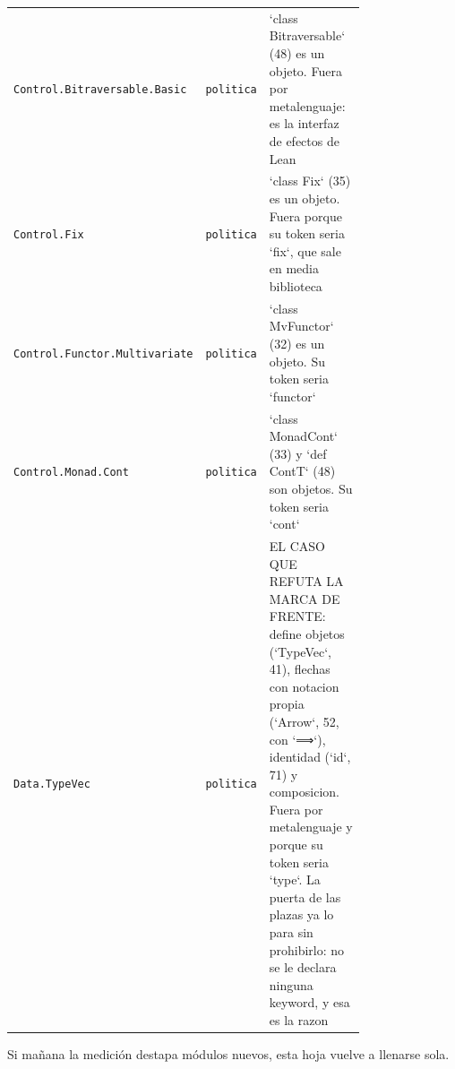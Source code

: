 \documentclass[10pt,a4paper]{article}
\begin{document}
\begin{tabular}{@{}>{\raggedright\arraybackslash}p{0.28\linewidth}l>{\raggedright\arraybackslash}p{0.50\linewidth}@{}}
\texttt{Control.\allowbreak{}Bitraversable.\allowbreak{}Basic} & \texttt{politica} & `class Bitraversable` (48) es un objeto. Fuera por metalenguaje: es la interfaz de efectos de Lean\\
\texttt{Control.\allowbreak{}Fix} & \texttt{politica} & `class Fix` (35) es un objeto. Fuera porque su token seria `fix`, que sale en media biblioteca\\
\texttt{Control.\allowbreak{}Functor.\allowbreak{}Multivariate} & \texttt{politica} & `class MvFunctor` (32) es un objeto. Su token seria `functor`\\
\texttt{Control.\allowbreak{}Monad.\allowbreak{}Cont} & \texttt{politica} & `class MonadCont` (33) y `def ContT` (48) son objetos. Su token seria `cont`\\
\texttt{Data.\allowbreak{}TypeVec} & \texttt{politica} & EL CASO QUE REFUTA LA MARCA DE FRENTE: define objetos (`TypeVec`, 41), flechas con notacion propia (`Arrow`, 52, con `⟹`), identidad (`id`, 71) y composicion. Fuera por metalenguaje y porque su token seria `type`. La puerta de las plazas ya lo para sin prohibirlo: no se le declara ninguna keyword, y esa es la razon\\
\bottomrule\end{tabular}\par\medskip

Si mañana la medición destapa módulos nuevos, esta hoja vuelve a llenarse
sola.\par\medskip
\end{document}
